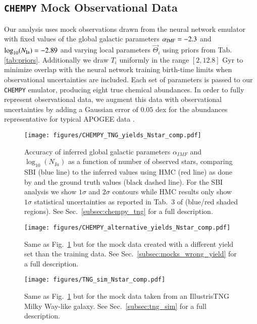 \documentclass{aa}
\begin{document}
\subsection{\texttt{CHEMPY} Mock Observational Data}
Our analysis uses mock observations drawn from the neural network emulator with fixed values of the global galactic parameters $\alpha_{\rm IMF}=-2.3$ and $\log_{10}(N_{\rm Ia})=-2.89$ and varying local parameters $\vec{\Theta}_i$ using priors from Tab. \ref{tab:priors}. Additionally we draw $T_i$ uniformly in the range $[2,12.8]$ Gyr to minimize overlap with the neural network training birth-time limits when observational uncertainties are included. 
Each set of parameters is passed to our \texttt{CHEMPY} emulator, producing eight true chemical abundances. In order to fully represent observational data, we augment this data with observational uncertainties by adding a Gaussian error of $0.05$ dex for the abundances representative for typical APOGEE data \citep{Majewski2016}.

\begin{figure*}
    \centering
    \texttt{[image: figures/CHEMPY\_TNG\_yields\_Nstar\_comp.pdf]}
    \vspace{-.5cm}
    \caption{Accuracy of inferred global galactic parameters $\alpha_{IMF}$ and $\log_{10}(N_{Ia})$ as a function of number of observed stars, comparing SBI (blue line) to the inferred values using HMC (red line) as done by \cite{Philcox_2019} and the ground truth values (black dashed line). For the SBI analysis we show $1\sigma$ and $2\sigma$ contours while HMC results only show $1\sigma$ statistical uncertainties as reported in Tab.~3 of \citet{Philcox_2019} (blue/red shaded regions). See Sec.~\ref{subsec:chempy_tng} for a full description.}
    \label{fig:CHEMPY_TNG_N_star_analysis}
\end{figure*}
\begin{figure*}
    \centering
    \texttt{[image: figures/CHEMPY\_alternative\_yields\_Nstar\_comp.pdf]}
    \vspace{-.5cm}
    \caption{Same as Fig.~\ref{fig:CHEMPY_TNG_N_star_analysis} but for the mock data created with a different yield set than the training data. See Sec.~\ref{subsec:mocks_wrong_yield} for a full description.}
    \label{fig:CHEMPY_alt_N_star_analysis}
\end{figure*}
\begin{figure*}
    \centering
    \texttt{[image: figures/TNG\_sim\_Nstar\_comp.pdf]}
    \vspace{-.5cm}
    \caption{Same as Fig.~\ref{fig:CHEMPY_TNG_N_star_analysis} but for the mock data taken from an IllustrisTNG Milky Way-like galaxy. See Sec.~\ref{subsec:tng_sim} for a full description.}
    \label{fig:TNG_N_star_analysis}
\end{figure*}
\end{document}
